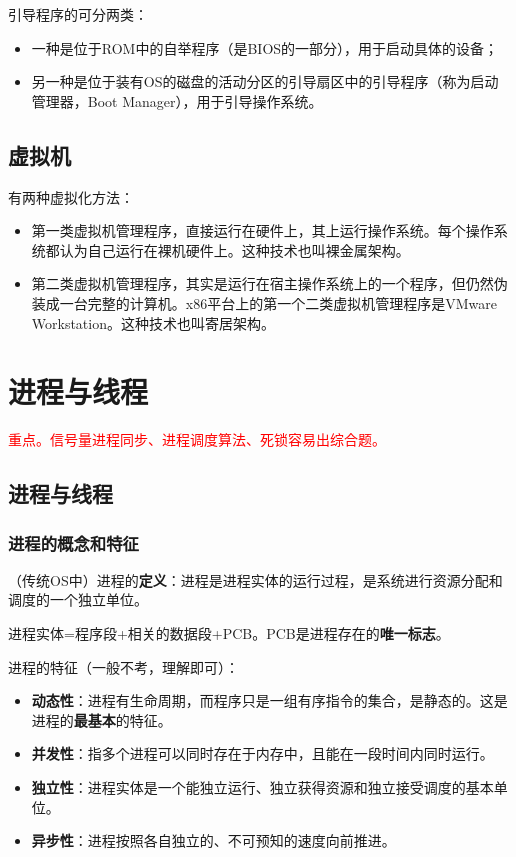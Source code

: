 \documentclass[12pt, a4paper, oneside]{ctexart}
\begin{document}
引导程序的可分两类：
\begin{itemize}
  \item 一种是位于ROM中的自举程序（是BIOS的一部分），用于启动具体的设备；
  \item 另一种是位于装有OS的磁盘的活动分区的引导扇区中的引导程序（称为启动管理器，Boot Manager），用于引导操作系统。
\end{itemize}

\subsection{虚拟机}

有两种虚拟化方法：
\begin{itemize}
  \item 第一类虚拟机管理程序，直接运行在硬件上，其上运行操作系统。每个操作系统都认为自己运行在裸机硬件上。这种技术也叫裸金属架构。
  \item 第二类虚拟机管理程序，其实是运行在宿主操作系统上的一个程序，但仍然伪装成一台完整的计算机。x86平台上的第一个二类虚拟机管理程序是VMware Workstation。这种技术也叫寄居架构。
\end{itemize}

\section{进程与线程}

\textcolor{red}{重点。信号量进程同步、进程调度算法、死锁容易出综合题。}

\subsection{进程与线程}

\subsubsection{进程的概念和特征}

（传统OS中）进程的\textbf{定义}：进程是进程实体的运行过程，是系统进行资源分配和调度的一个独立单位。

进程实体=程序段+相关的数据段+PCB。PCB是进程存在的\textbf{唯一标志}。

进程的特征（一般不考，理解即可）：
\begin{itemize}
    \item {\bf 动态性}：进程有生命周期，而程序只是一组有序指令的集合，是静态的。这是进程的\textbf{最基本}的特征。
    \item {\bf 并发性}：指多个进程可以同时存在于内存中，且能在一段时间内同时运行。
    \item {\bf 独立性}：进程实体是一个能独立运行、独立获得资源和独立接受调度的基本单位。
    \item {\bf 异步性}：进程按照各自独立的、不可预知的速度向前推进。
\end{itemize}
\end{document}
